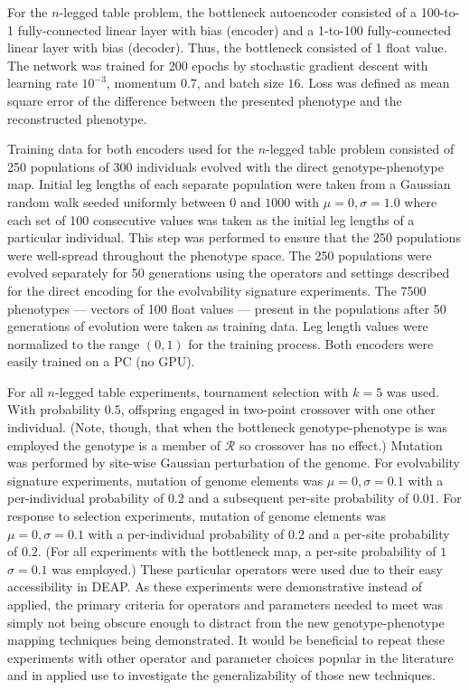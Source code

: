 For the $n$-legged table problem, the bottleneck autoencoder consisted of a 100-to-1 fully-connected linear layer with bias (encoder) and a 1-to-100 fully-connected linear layer with bias (decoder).
Thus, the bottleneck consisted of 1 float value.
The network was trained for 200 epochs by stochastic gradient descent with learning rate $10^{-3}$, momentum $0.7$, and batch size $16$.
Loss was defined as mean square error of the difference between the presented phenotype and the reconstructed phenotype.

Training data for both encoders used for the $n$-legged table problem consisted of 250 populations of 300 individuals evolved with the direct genotype-phenotype map.
Initial leg lengths of each separate population were taken from a Gaussian random walk seeded uniformly between $0$ and $1000$ with $\mu = 0, \sigma = 1.0$ where each set of 100 consecutive values was taken as the initial leg lengths of a particular individual.
This step was performed to ensure that the 250 populations were well-spread throughout the phenotype space.
The 250 populations were evolved separately for 50 generations using the operators and settings described for the direct encoding for the evolvability signature experiments.
The 7500 phenotypes --- vectors of 100 float values --- present in the populations after 50 generations of evolution were taken as training data.
Leg length values were normalized to the range $(0,1)$ for the training process.
Both encoders were easily trained on a PC (no GPU).

For all $n$-legged table experiments, tournament selection with $k = 5$ was used.
With probability $0.5$, offspring engaged in two-point crossover with one other individual.
(Note, though, that when the bottleneck genotype-phenotype is was employed the genotype is a member of $\mathcal{R}$ so crossover has no effect.)
Mutation was performed by site-wise Gaussian perturbation of the genome.
For evolvability signature experiments, mutation of genome elements was $\mu=0, \sigma=0.1$ with a per-individual probability of $0.2$ and a subsequent per-site probability of $0.01$.
For response to selection experiments, mutation of genome elements was $\mu=0, \sigma=0.1$ with a per-individual probability of $0.2$ and a per-site probability of $0.2$.
(For all experiments with the bottleneck map, a per-site probability of $1$ $\sigma=0.1$ was employed.)
These particular operators were used due to their easy accessibility in DEAP.
As these experiments were demonstrative instead of applied, the primary criteria
for operators and parameters needed to meet was simply not being obscure enough to distract from the new genotype-phenotype mapping techniques being demonstrated.
It would be beneficial to repeat these experiments with other operator and parameter choices popular in the literature and in applied use to investigate the generalizability of those new techniques.

